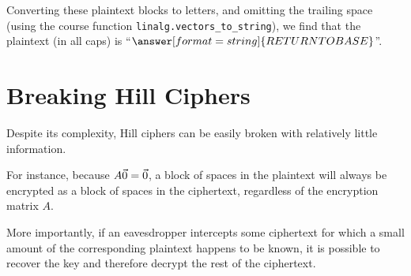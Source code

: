 \documentclass{ximera}
\begin{document}
\begin{example}
  Converting these plaintext blocks to letters, and omitting the trailing space (using the course function \texttt{linalg.vectors\_to\_string}),
  we find that the plaintext (in all caps) is ``$\answer[format=string]{RETURN TO BASE}$''.
\end{example}

\section*{Breaking Hill Ciphers}

Despite its complexity, Hill ciphers can be easily broken with relatively little information. 

For
instance, because $A\vec{0}=\vec{0}$, a block of spaces in the plaintext
will always be encrypted as a block of spaces in the ciphertext,
regardless of the encryption matrix $A$. 

More importantly, if an eavesdropper intercepts
some ciphertext for which a small amount of the corresponding
plaintext happens to be known, it is possible to recover
the key and therefore decrypt the rest of the ciphertext. 
\end{document}
